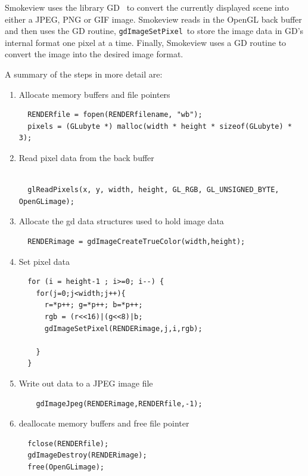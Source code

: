 \documentclass[11pt,twoside]{book}
\begin{document}
Smokeview uses the library GD~\cite{GDLIB} to convert the
currently displayed scene into either a JPEG, PNG or GIF image.
Smokeview reads in the OpenGL back buffer and then uses the GD
routine, {\tt gdImageSetPixel}\ to store the image data in GD's
internal format one pixel at a time.    Finally, Smokeview uses a
GD routine to convert the image into the desired image format.

A summary of the steps in more detail are:
\begin{enumerate}
\item Allocate memory buffers and file pointers
\begin{lstlisting}
  RENDERfile = fopen(RENDERfilename, "wb");
  pixels = (GLubyte *) malloc(width * height * sizeof(GLubyte) * 3);
\end{lstlisting}

\item Read pixel data from the back buffer
\begin{lstlisting}

  glReadPixels(x, y, width, height, GL_RGB, GL_UNSIGNED_BYTE, OpenGLimage);
\end{lstlisting}
\item Allocate the gd data structures used to hold image data
\begin{lstlisting}
  RENDERimage = gdImageCreateTrueColor(width,height);
\end{lstlisting}

\item Set pixel data

\begin{lstlisting}
  for (i = height-1 ; i>=0; i--) {
    for(j=0;j<width;j++){
      r=*p++; g=*p++; b=*p++;
      rgb = (r<<16)|(g<<8)|b;
      gdImageSetPixel(RENDERimage,j,i,rgb);

    }
  }
\end{lstlisting}

\item Write out data to a JPEG image file

\begin{lstlisting}
    gdImageJpeg(RENDERimage,RENDERfile,-1);
\end{lstlisting}

\item deallocate memory buffers and free file pointer

\begin{lstlisting}
  fclose(RENDERfile);
  gdImageDestroy(RENDERimage);
  free(OpenGLimage);
\end{lstlisting}

\end{enumerate}
\end{document}
